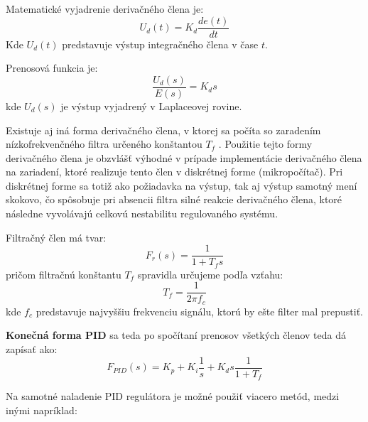 Matematické vyjadrenie derivačného člena je:
\begin{equation}
U_d (t) = K_d\dfrac{ de(t) }{ dt }
\end{equation}
Kde $U_d(t)$ predstavuje výstup integračného člena v čase $t$.
 
Prenosová funkcia je:
\begin{equation}
\dfrac{U_d( s )}{ E(s) } = K_d s
\end{equation}
kde $U_d(s)$ je výstup vyjadrený v Laplaceovej rovine.

Existuje aj iná forma derivačného člena, v ktorej sa počíta so zaradením nízkofrekvenčného filtra určeného konštantou $T_f$ . Použitie tejto formy derivačného člena je obzvlášť výhodné v prípade implementácie derivačného člena na zariadení, ktoré realizuje tento člen v diskrétnej forme (mikropočítač). Pri diskrétnej forme sa totiž ako požiadavka na výstup, tak aj výstup samotný mení skokovo, čo spôsobuje pri absencii filtra silné reakcie derivačného člena, ktoré následne vyvolávajú celkovú nestabilitu  regulovaného systému.  

Filtračný člen má tvar:
\begin{equation}
F_r ( s ) = \dfrac { 1 }{ 1 + T_f s }
\end{equation}
pričom filtračnú konštantu $T_f$  spravidla určujeme podľa vzťahu:
\begin{equation}
T_f =  \dfrac {1} { 2 \pi f_c }
\label{eq:TFconst}
\end{equation}
kde $f_c$ predstavuje najvyššiu frekvenciu signálu, ktorú by ešte filter mal prepustiť.

\textbf{Konečná forma PID} sa teda po spočítaní prenosov všetkých členov teda dá zapísať ako:
\begin{equation}
F_{PID} (s) = K_p + K_i \dfrac{1}{s} + K_d s \dfrac{ 1 } { 1 + T_f }
\label{eq:compPID}
\end{equation}

Na samotné naladenie \ac{PID} regulátora je možné použiť viacero metód, medzi inými napríklad:

